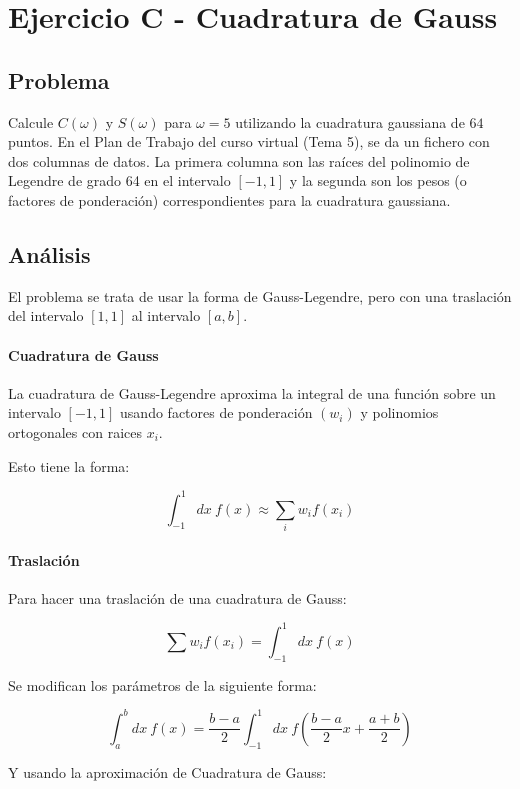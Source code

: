 \section{Ejercicio C - Cuadratura de Gauss}


\subsection{Problema}

Calcule $C(\omega)$ y $S(\omega)$ para $\omega = 5$ utilizando la cuadratura gaussiana de $64$ puntos. En el Plan de Trabajo del curso virtual (Tema 5), se da un fichero con dos columnas de datos. La primera columna son las raíces del polinomio de Legendre de grado 64 en el intervalo $[-1, 1]$ y la segunda son los pesos (o factores de ponderación) correspondientes para la cuadratura gaussiana.

\subsection{Análisis}

El problema se trata de usar la forma de Gauss-Legendre, pero con una traslación del intervalo $[1, 1]$ al intervalo $[a, b]$.

\paragraph{Cuadratura de Gauss}

La cuadratura de Gauss-Legendre aproxima la integral de una función sobre un intervalo $[-1, 1]$ usando factores de ponderación $(w_i)$ y polinomios ortogonales con raices $x_i$.

Esto tiene la forma:

$$
\int_{-1}^{1} dx ~ f(x) 
\approx \sum_{i} w_i f(x_i)
$$


\paragraph{Traslación}
Para hacer una traslación de una cuadratura de Gauss:

$$ \sum w_i f(x_i) = \int_{-1}^{1} dx ~ f(x) $$ 

Se modifican los parámetros de la siguiente forma: 

$$
\int_{a}^{b}dx~ f(x) = \frac{b - a}{2} \int_{-1}^{1} dx ~ f( \frac{b-a}{2} x + \frac{a + b}{2})
$$

Y usando la aproximación de Cuadratura de Gauss:

